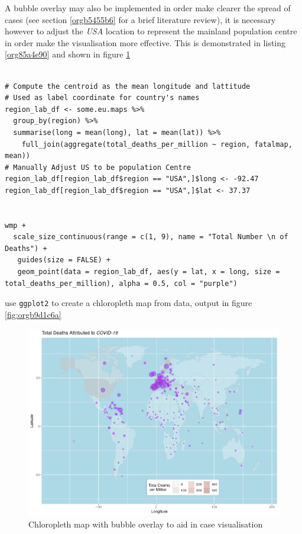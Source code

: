 \documentclass[11pt]{article}
\begin{document}
A bubble overlay may also be implemented in order make clearer the spread of cases (see section \ref{orgb5455b6} for a brief literature review), it is necessary however to adjust the \emph{USA} location to represent the mainland population centre in order make the visualisation more effective. This is demonstrated in listing \ref{org85a4e90} and shown in figure \ref{fig:org9c4f0e3}

\begin{listing}[htbp]
\begin{verbatim}

# Compute the centroid as the mean longitude and lattitude
# Used as label coordinate for country's names
region_lab_df <- some.eu.maps %>%
  group_by(region) %>%
  summarise(long = mean(long), lat = mean(lat)) %>%
    full_join(aggregate(total_deaths_per_million ~ region, fatalmap, mean))
# Manually Adjust US to be population Centre
region_lab_df[region_lab_df$region == "USA",]$long <- -92.47
region_lab_df[region_lab_df$region == "USA",]$lat <- 37.37


wmp +
  scale_size_continuous(range = c(1, 9), name = "Total Number \n of Deaths") +
   guides(size = FALSE) +
   geom_point(data = region_lab_df, aes(y = lat, x = long, size = total_deaths_per_million), alpha = 0.5, col = "purple")
\end{verbatim}
\caption{\label{org85a4e90}use \texttt{ggplot2} to create a chloropleth map from data, output in figure \ref{fig:orgb9d1c6a}}
\end{listing}

\begin{figure}[htbp]
\centering
\includegraphics[width=14cm]{FirstChAllbub.png}
\caption{\label{fig:org9c4f0e3}Chloropleth map with bubble overlay to aid in case visualisation}
\end{figure}
\end{document}
